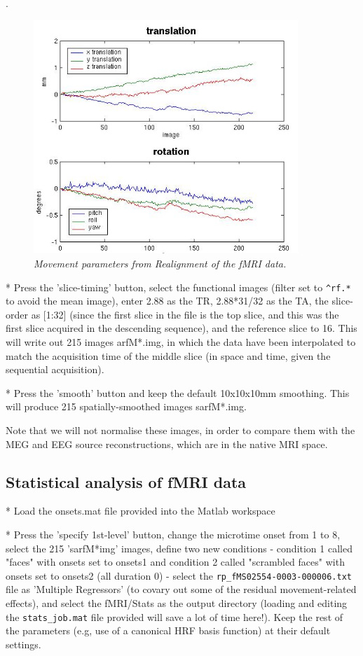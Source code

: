 .
\begin{figure}
\begin{center}
\includegraphics[width=100mm]{multimodal/figures/figure_32_20}
\caption{\em  Movement parameters from Realignment of the fMRI data. \label{fig_32_20}}
\end{center}
\end{figure}

* Press the 'slice-timing' button, select the functional images (filter set to \verb!^rf.*! to avoid the mean image), enter 2.88 as the TR, 2.88*31/32 as the TA, the slice-order as [1:32] (since the first slice in the file is the top slice, and this was the first slice acquired in the descending sequence), and the reference slice to 16. This will write out 215 images arfM*.img, in which the data have been interpolated to match the acquisition time of the middle slice (in space and time, given the sequential acquisition).

* Press the 'smooth' button and keep the default 10x10x10mm smoothing. This will produce 215 spatially-smoothed images sarfM*.img.

Note that we will not normalise these images, in order to compare them with the MEG and EEG source reconstructions, which are in the native MRI space.

\subsection{Statistical analysis of fMRI data}

* Load the onsets.mat file provided into the Matlab workspace

* Press the 'specify 1st-level' button, change the microtime onset from 1 to 8, select the 215 'sarfM*img' images, define two new conditions - condition 1 called "faces" with onsets set to onsets{1} and condition 2 called "scrambled faces" with onsets set to onsets{2} (all duration 0) - select the  \verb!rp_fMS02554-0003-000006.txt! file as 'Multiple Regressors' (to covary out some of the residual movement-related effects), and select the fMRI/Stats as the output directory (loading and editing the \verb!stats_job.mat! file provided will save a lot of time here!). Keep the rest of the parameters (e.g, use of a canonical HRF basis function) at their default settings.

